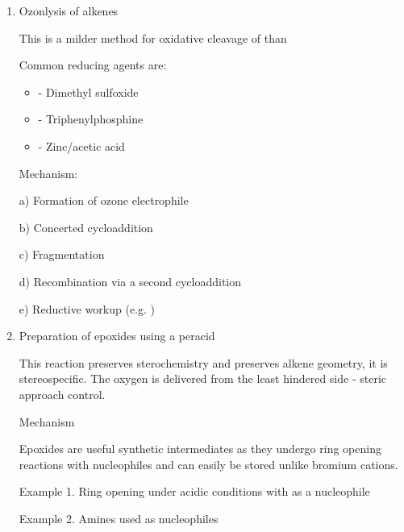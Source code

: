 \begin{enumerate}[label=\alph*)]

  \item Ozonlysis of alkenes

    This is a milder method for oxidative cleavage of  than 


    Common reducing agents are:

    \begin{itemize}
      \item {} - Dimethyl sulfoxide
      \item {} - Triphenylphosphine
      \item {} - Zinc/acetic acid
    \end{itemize}

    Mechanism:

    a) Formation of ozone electrophile


    b) Concerted cycloaddition


    c) Fragmentation


    d) Recombination via a second cycloaddition


    e) Reductive workup (e.g. )


  \item Preparation of epoxides using a peracid

    This reaction preserves sterochemistry and preserves alkene geometry, it is
    stereospecific. The oxygen is delivered from the least hindered side - steric
    approach control.


    Mechanism


    Epoxides are useful synthetic intermediates as they undergo ring opening
    reactions with nucleophiles and can easily be stored unlike bromium cations.

    Example 1. Ring opening under acidic conditions with  as a nucleophile


    Example 2. Amines used as nucleophiles



\end{enumerate}
